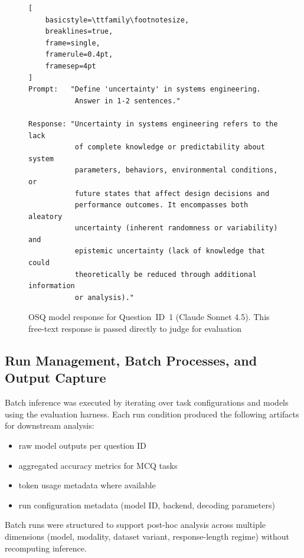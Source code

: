 \begin{figure}[htbp]
\centering
\begin{scriptsize}
\begin{lstlisting}[
    basicstyle=\ttfamily\footnotesize,
    breaklines=true,
    frame=single,
    framerule=0.4pt,
    framesep=4pt
]
Prompt:   "Define 'uncertainty' in systems engineering.
           Answer in 1-2 sentences."

Response: "Uncertainty in systems engineering refers to the lack
           of complete knowledge or predictability about system
           parameters, behaviors, environmental conditions, or
           future states that affect design decisions and
           performance outcomes. It encompasses both aleatory
           uncertainty (inherent randomness or variability) and
           epistemic uncertainty (lack of knowledge that could
           theoretically be reduced through additional information
           or analysis)."
\end{lstlisting}
\end{scriptsize}
\caption{OSQ model response for Question~ID~1 (Claude Sonnet 4.5). This free-text response is passed directly to judge for evaluation}
\label{lst:osq_response_example}
\end{figure}



\subsection{Run Management, Batch Processes, and Output Capture}
\label{subsec:ch3_obj3_output_capture}

Batch inference was executed by iterating over task configurations and models using the evaluation harness. Each run condition produced the following artifacts for downstream analysis:

\begin{itemize}
    \item raw model outputs per question ID
    \item aggregated accuracy metrics for MCQ tasks
    \item token usage metadata where available
    \item run configuration metadata (model ID, backend, decoding parameters)
\end{itemize}

Batch runs were structured to support post-hoc analysis across multiple dimensions (model, modality, dataset variant, response-length regime) without recomputing inference.

